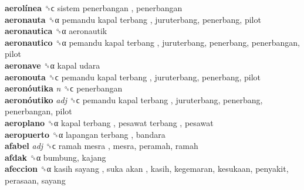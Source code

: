 \textbf{aerolínea} ␝ϲ   sistem penerbangan , penerbangan  \\
\textbf{aeronauta} ␝α   pemandu kapal terbang , juruterbang, penerbang, pilot  \\
\textbf{aeronautica} ␝α  aeronautik  \\
\textbf{aeronautico} ␝α   pemandu kapal terbang , juruterbang, penerbang, penerbangan, pilot  \\
\textbf{aeronave} ␝α   kapal udara   \\
\textbf{aeronouta} ␝ϲ   pemandu kapal terbang , juruterbang, penerbang, pilot  \\
\textbf{aeronóutika} \emph{n}  ␝ϲ  penerbangan  \\
\textbf{aeronóutiko} \emph{adj}  ␝ϲ   pemandu kapal terbang , juruterbang, penerbang, penerbangan, pilot  \\
\textbf{aeroplano} ␝α   kapal terbang ,  pesawat terbang , pesawat  \\
\textbf{aeropuerto} ␝α   lapangan terbang , bandara  \\
\textbf{afabel} \emph{adj}  ␝ϲ   ramah mesra , mesra, peramah, ramah  \\
\textbf{afdak} ␝α  bumbung, kajang  \\
\textbf{afeccion} ␝α   kasih sayang ,  suka akan , kasih, kegemaran, kesukaan, penyakit, perasaan, sayang  \\

